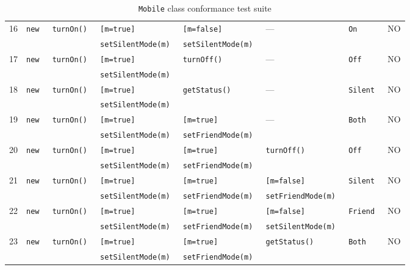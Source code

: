 \begin{table}[ht]
\begin{tabular}{|c|*{7}{l|}}
    16 & \tt new & \tt turnOn() & \tt [m=true]         & \tt [m=false] & --- & \tt On & NO \\
       &         &              & \tt setSilentMode(m) & \tt setSilentMode(m) &&& \\ \hline
    17 & \tt new & \tt turnOn() & \tt [m=true] & \tt turnOff() & --- & \tt Off & NO \\
       &         &              & \tt setSilentMode(m) &&&& \\ \hline
    18 & \tt new & \tt turnOn() & \tt [m=true] & \tt getStatus() & --- & \tt Silent & NO \\
       &         &              & \tt setSilentMode(m) &&&& \\ \hline
    19 & \tt new & \tt turnOn() & \tt [m=true]         & \tt [m=true] & --- & \tt Both & NO \\
       &         &              & \tt setSilentMode(m) & \tt setFriendMode(m) &&& \\ \hline
    20 & \tt new & \tt turnOn() & \tt [m=true]         & \tt [m=true] & \tt turnOff() & \tt Off & NO \\
       &         &              & \tt setSilentMode(m) & \tt setFriendMode(m) &&& \\ \hline
    21 & \tt new & \tt turnOn() & \tt [m=true]         & \tt [m=true]         & \tt [m=false] & \tt Silent & NO \\
       &         &              & \tt setSilentMode(m) & \tt setFriendMode(m) & \tt setFriendMode(m) && \\ \hline
    22 & \tt new & \tt turnOn() & \tt [m=true]         & \tt [m=true]         & \tt [m=false] & \tt Friend & NO \\
       &         &              & \tt setSilentMode(m) & \tt setFriendMode(m) & \tt setSilentMode(m) && \\ \hline
    23 & \tt new & \tt turnOn() & \tt [m=true]         & \tt [m=true] & \tt getStatus() & \tt Both & NO \\
       &         &              & \tt setSilentMode(m) & \tt setFriendMode(m) &&& \\ \hline
  \end{tabular}
  \caption{\texttt{Mobile} class conformance test suite}
  \label{tab:classes.mobile.conformance}
\end{table}